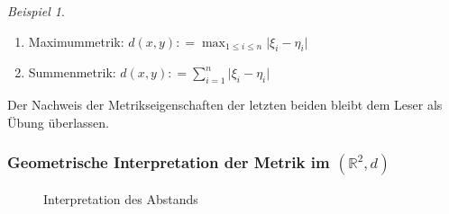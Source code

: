 \documentclass[ngerman,titlepage,twoside, parskip=half*]{scrreprt}
\newcommand*{\R}{\mathbb{R}}
\theoremstyle{plain}
\theoremstyle{definition}
\theoremstyle{remark}
\newtheorem*{beispiel}{Beispiel}
\newcommand*{\abs}[2][]{#1\lvert#2#1\rvert}
\newcommand*{\coloneqq}{\mathrel{\mathop:}=}
\begin{document}
\begin{beispiel}
\begin{enumerate}
\begin{enumerate}[(M1)]
\begin{description}
      \begin{gather*}\sqrt{\sum_{i=1}^n \abs{a_i + b_i}^2} \leq \sqrt{\sum_{i=1}^n
      \abs{a_i}^2} + \sqrt{\sum_{i=1}^n \abs{b_i}^2}\end{gather*}
      \begin{proof}
	Sei o.\,B.\,d.\,A. $\sum_{i=1}^n \abs{a_i +b_i}^2 > 0$.
      \begin{align*}
        \sum_{i=1}^n \abs{a_i +b_i}^2 & = \sum_{i=1}^n \abs{a_i +b_i} \abs{a_i
	   +b_i} \leq \sum_{i=1}^n (\abs{a_i}+ \abs{b_i}) \abs{a_i +b_i}\\
        & = \sum_{i=1}^n \abs{a_i} \abs{a_i +b_i} + \sum_{i=1}^n \abs{b_i}
	   \abs{a_i +b_i}\\
        & \leq \sqrt{\sum_{i=1}^n \abs{a_i}^2} \sqrt{\sum_{i=1}^n \abs{a_i
	   +b_i}^2} + \sqrt{\sum_{i=1}^n \abs{b_i}^2} \sqrt{\sum_{i=1}^n
	   \abs{a_i +b_i}^2}\\
	& \Rightarrow \sqrt{\sum_{i=1}^n \abs{a_i +b_i}^2} \leq
	   \sqrt{\sum_{i=1}^n \abs{a_i}^2} + \sqrt{\sum_{i=1}^n \abs{b_i}^2}
      \end{align*}
      \end{proof}
    \end{description}
  \end{enumerate}
\item Maximummetrik: $d(x,y)\coloneqq \max_{1 \leq i \leq n}
  \abs{\xi_{i}-\eta_{i}}$
\item Summenmetrik: $d(x,y) \coloneqq \sum_{i=1}^n \abs{\xi_{i}-\eta_{i}}$
\end{enumerate}
  Der Nachweis der Metrikseigenschaften der letzten beiden bleibt dem Leser
  als Übung überlassen.
\end{beispiel}

\subsubsection{Geometrische Interpretation der Metrik im $(\R^2,d)$}

\begin{figure}[htb]
  \centering
  \caption{Interpretation des Abstands}
  \label{fig:inter-abstand}
\end{figure}
\end{document}
